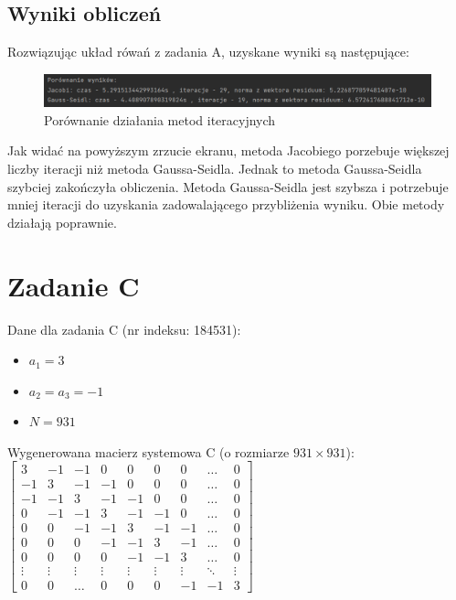 \documentclass[fleqn]{article}
\begin{document}
    \newpage
    \subsection{Wyniki obliczeń}
    Rozwiązując układ rówań z zadania A, uzyskane wyniki są następujące:

    \begin{figure}[h]

        \centering
        \includegraphics[width=\textwidth]{porownaniGSJac.png}
        \centering
        \caption{Porównanie działania metod iteracyjnych}

    \end{figure}

    \noindent Jak widać na powyższym zrzucie ekranu, metoda Jacobiego porzebuje większej liczby iteracji niż metoda Gaussa-Seidla.
    Jednak to metoda Gaussa-Seidla szybciej zakończyła obliczenia. Metoda Gaussa-Seidla jest szybsza i potrzebuje mniej iteracji 
    do uzyskania zadowalającego przybliżenia wyniku. Obie metody działają poprawnie.
    \section{Zadanie C}
    Dane dla zadania C (nr indeksu: 184531):
    \begin{itemize}
        \item $a_1 = 3$ 
        \item $a_2 = a_3 = -1$
        \item $N = 931$
    \end{itemize}

    \noindent Wygenerowana macierz systemowa C (o rozmiarze $931 \times 931$): \\

    $\begin{bmatrix}
    3 & -1 & -1 & 0 & 0 & 0 & 0 & \ldots & 0 \\
    -1 & 3 & -1 & -1 & 0 & 0 & 0 & \ldots & 0 \\
    -1 & -1 & 3 & -1 & -1 & 0 & 0 & \ldots & 0 \\
    0 & -1 & -1 & 3 & -1 & -1 & 0 & \ldots & 0 \\
    0 & 0 & -1 & -1 & 3 & -1 & -1 & \ldots & 0 \\
    0 & 0 & 0 & -1 & -1 & 3 & -1 & \ldots & 0 \\
    0 & 0 & 0 & 0 & -1 & -1 & 3 & \ldots & 0 \\
    \vdots & \vdots & \vdots & \vdots & \vdots & \vdots & \vdots & \ddots & \vdots \\
    0 & 0 & \ldots & 0 & 0 & 0 & -1 & -1 & 3
    \end{bmatrix}$
    \\ 
\end{document}

